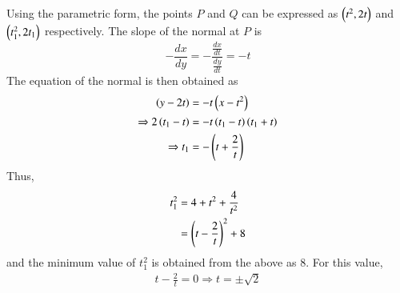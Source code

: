 Using the parametric form, the points $P$ and $Q$ can be expressed as $\left(t^2,2t\right)$ and $\left(t_1^2,2t_1\right)$ respectively.  The slope of the normal at $P$ is
%
\begin{equation}
-\frac{dx}{dy} = -\frac{\frac{dx}{dt}}{\frac{dy}{dt}} = - t
\end{equation}
%
The equation of the normal is then obtained as
%
\begin{align}
\left(y - 2t\right) &= -t\left(x -t^2\right) \\
\Rightarrow 2\left(t_1-t\right) &= -t\left(t_1-t\right)\left(t_1+t\right) \\
\Rightarrow t_1 &= -\left(t + \frac{2}{t}\right)
\end{align}
%
Thus,
%
\begin{align}
t_1^2 &= 4 + t^2 + \frac{4}{t^2} \\
&= \left(t - \frac{2}{t}\right)^2 + 8  
\end{align}
%
and the minimum value of $t_1^2$ is obtained from the above as 8. For this value,
%
\begin{align}
t - \frac{2}{t} = 0 \Rightarrow t = \pm \sqrt{2}
\end{align}
%
